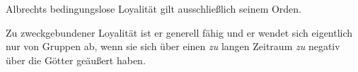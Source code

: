 
Albrechts bedingungslose Loyalität gilt ausschließlich seinem Orden.

Zu zweckgebundener Loyalität ist er generell fähig und er wendet sich eigentlich nur von Gruppen ab, wenn sie sich über einen \emph{zu} langen Zeitraum \emph{zu} negativ über die Götter geäußert haben.
